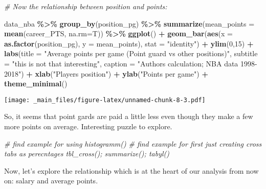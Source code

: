\documentclass[
]{book}
\newenvironment{Shaded}{\begin{snugshade}}{\end{snugshade}}
\newcommand{\AttributeTok}[1]{\textcolor[rgb]{0.13,0.29,0.53}{#1}}
\newcommand{\CommentTok}[1]{\textcolor[rgb]{0.56,0.35,0.01}{\textit{#1}}}
\newcommand{\DecValTok}[1]{\textcolor[rgb]{0.00,0.00,0.81}{#1}}
\newcommand{\FunctionTok}[1]{\textcolor[rgb]{0.13,0.29,0.53}{\textbf{#1}}}
\newcommand{\NormalTok}[1]{#1}
\newcommand{\SpecialCharTok}[1]{\textcolor[rgb]{0.81,0.36,0.00}{\textbf{#1}}}
\newcommand{\StringTok}[1]{\textcolor[rgb]{0.31,0.60,0.02}{#1}}
\begin{document}
\begin{Shaded}
\begin{Highlighting}[]
\CommentTok{\# Now the relationship between position and points:}

\NormalTok{data\_nba }\SpecialCharTok{\%\textgreater{}\%} 
  \FunctionTok{group\_by}\NormalTok{(position\_pg) }\SpecialCharTok{\%\textgreater{}\%}
  \FunctionTok{summarize}\NormalTok{(}\AttributeTok{mean\_points =} \FunctionTok{mean}\NormalTok{(career\_PTS, }\AttributeTok{na.rm=}\NormalTok{T)) }\SpecialCharTok{\%\textgreater{}\%}
  \FunctionTok{ggplot}\NormalTok{() }\SpecialCharTok{+}
  \FunctionTok{geom\_bar}\NormalTok{(}\FunctionTok{aes}\NormalTok{(}\AttributeTok{x =} \FunctionTok{as.factor}\NormalTok{(position\_pg), }
               \AttributeTok{y =}\NormalTok{ mean\_points),}
           \AttributeTok{stat =} \StringTok{"identity"}\NormalTok{) }\SpecialCharTok{+} 
  \FunctionTok{ylim}\NormalTok{(}\DecValTok{0}\NormalTok{,}\DecValTok{15}\NormalTok{) }\SpecialCharTok{+}
  \FunctionTok{labs}\NormalTok{(}\AttributeTok{title =} \StringTok{"Average points per game (Point guard vs other positions)"}\NormalTok{,}
       \AttributeTok{subtitle =} \StringTok{"this is not that interesting"}\NormalTok{,}
       \AttributeTok{caption =} \StringTok{"Authors\textquotesingle{} calculation; NBA data 1998{-}2018"}\NormalTok{) }\SpecialCharTok{+}
  \FunctionTok{xlab}\NormalTok{(}\StringTok{"Player\textquotesingle{}s position"}\NormalTok{) }\SpecialCharTok{+}
  \FunctionTok{ylab}\NormalTok{(}\StringTok{"Points per game"}\NormalTok{) }\SpecialCharTok{+}
  \FunctionTok{theme\_minimal}\NormalTok{()}
\end{Highlighting}
\end{Shaded}

\texttt{[image: \_main\_files/figure-latex/unnamed-chunk-8-3.pdf]}

So, it seems that point gards are paid a little less even though they make a few more points on average. Interesting puzzle to explore.

\begin{Shaded}
\begin{Highlighting}[]
\CommentTok{\# find example for using histogramm()}
\CommentTok{\# find example for first just creating cross tabs as perecntages tbl\_cross(); summarize(); tabyl()}
\end{Highlighting}
\end{Shaded}

Now, let's explore the relationship which is at the heart of our analysis from now on: salary and average points.
\end{document}
